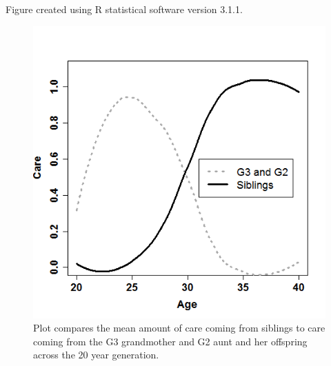 \documentclass[10pt]{article}
\begin{document}
Figure created using R statistical software version 3.1.1.

\begin{figure}[!ht]

  \includegraphics[width=1\textwidth]{Fig2.png}
\caption{Plot compares the mean amount of care coming from siblings to care coming from the G3 grandmother and G2 aunt and her offspring across the 20 year generation.}
\label{fig:simmns}

\end{figure}
\end{document}
